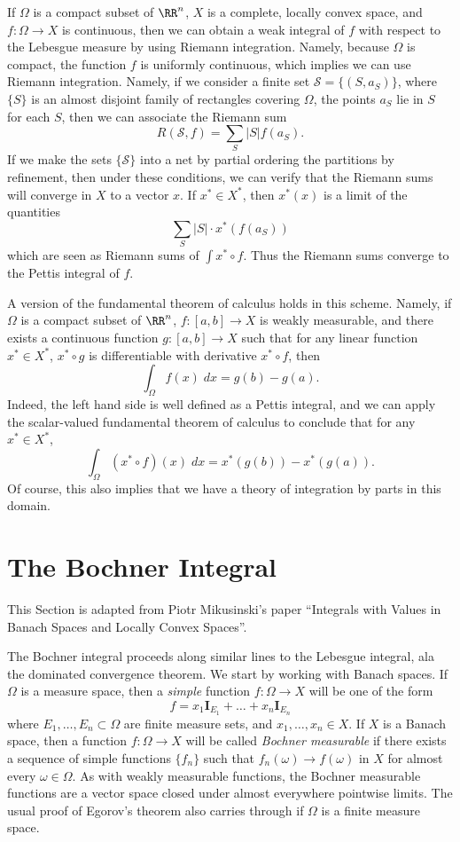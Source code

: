 If $\Omega$ is a compact subset of $\RR^n$, $X$ is a complete, locally convex space, and $f: \Omega \to X$ is continuous, then we can obtain a weak integral of $f$ with respect to the Lebesgue measure by using Riemann integration. Namely, because $\Omega$ is compact, the function $f$ is uniformly continuous, which implies we can use Riemann integration. Namely, if we consider a finite set $\mathcal{S} = \{ (S,a_S) \}$, where $\{ S \}$ is an almost disjoint family of rectangles covering $\Omega$, the points $a_S$ lie in $S$ for each $S$, then we can associate the Riemann sum
%
\[ R(\mathcal{S}, f) = \sum_S |S| f(a_S). \]
%
If we make the sets $\{ \mathcal{S} \}$ into a net by partial ordering the partitions by refinement, then under these conditions, we can verify that the Riemann sums will converge in $X$ to a vector $x$. If $x^* \in X^*$, then $x^*(x)$ is a limit of the quantities
%
\[ \sum_S |S| \cdot x^*(f(a_S)) \]
%
which are seen as Riemann sums of $\int x^* \circ f$. Thus the Riemann sums converge to the Pettis integral of $f$.

A version of the fundamental theorem of calculus holds in this scheme. Namely, if $\Omega$ is a compact subset of $\RR^n$, $f: [a,b] \to X$ is weakly measurable, and there exists a continuous function $g: [a,b] \to X$ such that for any linear function $x^* \in X^*$, $x^* \circ g$ is differentiable with derivative $x^* \circ f$, then
%
\[ \int_\Omega f(x)\; dx = g(b) - g(a). \]
%
Indeed, the left hand side is well defined as a Pettis integral, and we can apply the scalar-valued fundamental theorem of calculus to conclude that for any $x^* \in X^*$,
%
\[ \int_\Omega (x^* \circ f)(x)\; dx = x^*(g(b)) - x^*(g(a)). \]
%
Of course, this also implies that we have a theory of integration by parts in this domain.

\section{The Bochner Integral}

\begin{remark}
    This Section is adapted from Piotr Mikusinski's paper ``Integrals with Values in Banach Spaces and Locally Convex Spaces''.
\end{remark}

The Bochner integral proceeds along similar lines to the Lebesgue integral, ala the dominated convergence theorem. We start by working with Banach spaces. If $\Omega$ is a measure space, then a \emph{simple} function $f: \Omega \to X$ will be one of the form
%
\[ f = x_1 \mathbf{I}_{E_1} + \dots + x_n \mathbf{I}_{E_n} \]
%
where $E_1,\dots,E_n \subset \Omega$ are finite measure sets, and $x_1,\dots,x_n \in X$. If $X$ is a Banach space, then a function $f: \Omega \to X$ will be called \emph{Bochner measurable} if there exists a sequence of simple functions $\{ f_n \}$ such that $f_n(\omega) \to f(\omega)$ in $X$ for almost every $\omega \in \Omega$. As with weakly measurable functions, the Bochner measurable functions are a vector space closed under almost everywhere pointwise limits. The usual proof of Egorov's theorem also carries through if $\Omega$ is a finite measure space.

